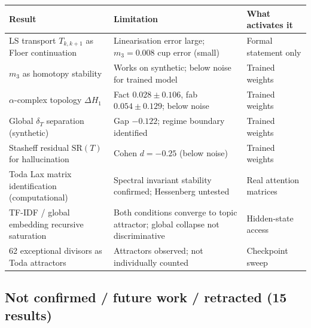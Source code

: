 \documentclass[11pt]{amsart}
\theoremstyle{definition}
\begin{document}
\begin{center}
\renewcommand{\arraystretch}{1.25}
\small
\begin{tabular}{@{}p{5.5cm}p{5.5cm}p{2.5cm}@{}}
\toprule
Result & Limitation & What activates it \\
\midrule
LS transport $T_{k,k+1}$ as Floer continuation &
  Linearisation error large; $m_3=0.008$ cup error (small) &
  Formal statement only \\
$m_3$ as homotopy stability &
  Works on synthetic; below noise for trained model &
  Trained weights \\
$\alpha$-complex topology $\Delta H_1$ &
  Fact $0.028\pm0.106$, fab $0.054\pm0.129$; below noise &
  Trained weights \\
Global $\delta_T$ separation (synthetic) &
  Gap $-0.122$; regime boundary identified &
  Trained weights \\
Stasheff residual $\mathrm{SR}(T)$ for hallucination &
  Cohen $d=-0.25$ (below noise) &
  Trained weights \\
Toda Lax matrix identification (computational) &
  Spectral invariant stability confirmed; Hessenberg untested &
  Real attention matrices \\
TF-IDF / global embedding recursive saturation &
  Both conditions converge to topic attractor; global collapse not discriminative &
  Hidden-state access \\
62 exceptional divisors as Toda attractors &
  Attractors observed; not individually counted &
  Checkpoint sweep \\
\bottomrule
\end{tabular}
\end{center}

\subsection{Not confirmed / future work / retracted (15 results)}
\end{document}
